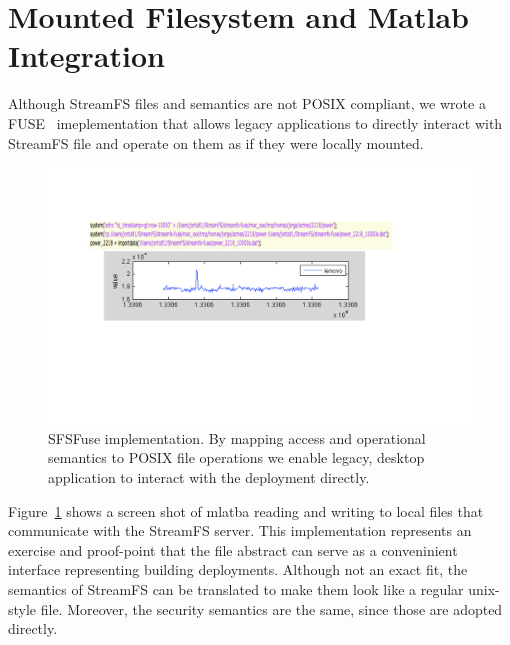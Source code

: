 \section{Mounted Filesystem and Matlab Integration}

Although StreamFS files and semantics are not POSIX compliant, we wrote a FUSE~\cite{fuse} imeplementation
that allows legacy applications to directly interact with StreamFS file and operate on them as if they were
locally mounted.

\begin{figure}[htb!]
\begin{center}
\includegraphics[scale=0.6]{figs/sfs_matlab}
\caption{SFSFuse implementation.  By mapping access and operational semantics to POSIX file operations
we enable legacy, desktop application to interact with the deployment directly.}
\label{fig:sfsfuse}
\end{center}
\end{figure}

Figure~\ref{fig:sfsfuse} shows a screen shot of mlatba reading and writing to local files that communicate 
with the StreamFS server.  This implementation represents an exercise and proof-point that the file abstract
can serve as a conveninient interface representing building deployments.  Although not an exact
fit, the semantics of StreamFS can be translated to make them look like a regular unix-style file.
Moreover, the security semantics are the same, since those are adopted directly.

